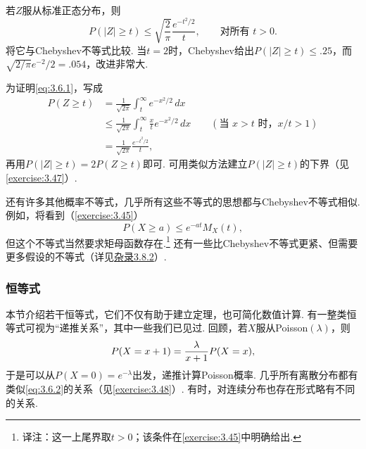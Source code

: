 \begin{example}[一个正态概率不等式]\label{ex:3.6.3}
若$Z$服从标准正态分布，则
\begin{equation}\label{eq:3.6.1}
P(|Z|\ge t)\le\sqrt{\frac2\pi}\frac{e^{-t^2/2}}t,\qquad\text{对所有 }t>0.
\end{equation}
将它与Chebyshev不等式比较. 当$t=2$时，Chebyshev给出$P(|Z|\ge t)\le.25$，而$\sqrt{2/\pi}e^{-2}/2=.054$，改进非常大.

为证明\eqref{eq:3.6.1}，写成
\begin{align*}
P(Z\ge t)&=\frac1{\sqrt{2\pi}}\int_t^\infty e^{-x^2/2}\,dx\\
&\le\frac1{\sqrt{2\pi}}\int_t^\infty\frac xt e^{-x^2/2}\,dx\qquad(\text{当 }x>t\text{ 时，}x/t>1)\\
&=\frac1{\sqrt{2\pi}}\frac{e^{-t^2/2}}t,
\end{align*}
再用$P(|Z|\ge t)=2P(Z\ge t)$即可. 可用类似方法建立$P(|Z|\ge t)$的下界\mbox{（见\autoref{exercise:3.47}）.}
\end{example}
还有许多其他概率不等式，几乎所有这些不等式的思想都与Chebyshev不等式相似. 例如，将看到（\autoref{exercise:3.45}）
$$P(X\ge a)\le e^{-at}M_X(t),$$
但这个不等式当然要求矩母函数存在.\footnote{译注：这一上尾界取$t>0$；该条件在\autoref{exercise:3.45}中明确给出.} 还有一些比Chebyshev不等式更紧、但需要更多假设的不等式（详见\hyperref[sec:3.8.2]{杂录3.8.2}）.

\subsubsection{恒等式}\label{sec:3.6.2}
本节介绍若干恒等式，它们不仅有助于建立定理，也可简化数值计算. 有一整类恒等式可视为“递推关系”，其中一些我们已见过. 回顾，若$X$服从Poisson$(\lambda)$，则
\begin{equation}\label{eq:3.6.2}\index{SI0375@递推关系}
P(X=x+1)=\frac\lambda{x+1}P(X=x),
\end{equation}
于是可以从$P(X=0)=e^{-\lambda}$出发，递推计算Poisson概率. 几乎所有离散分布都有类似\eqref{eq:3.6.2}的关系（见\autoref{exercise:3.48}）. 有时，对连续分布也存在形式略有不同的关系.


